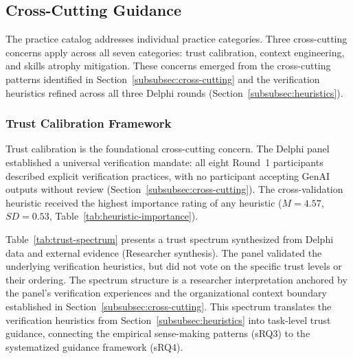 \subsection{Cross-Cutting Guidance}\label{subsec:cross-cutting-guidance}

The practice catalog addresses individual practice categories. Three
cross-cutting concerns apply across all seven categories: trust calibration,
context engineering, and skills atrophy mitigation. These concerns emerged from
the cross-cutting patterns identified in Section~\ref{subsubsec:cross-cutting}
and the verification heuristics refined across all three Delphi rounds
(Section~\ref{subsubsec:heuristics}).

\subsubsection{Trust Calibration Framework}\label{subsubsec:trust-framework}

Trust calibration is the foundational cross-cutting concern. The Delphi panel
established a universal verification mandate: all eight Round~1 participants
described explicit verification practices, with no participant accepting GenAI
outputs without review (Section~\ref{subsubsec:cross-cutting}). The
cross-validation heuristic received the highest importance rating of any
heuristic ($M = 4.57$, $SD = 0.53$, Table~\ref{tab:heuristic-importance}).

Table~\ref{tab:trust-spectrum} presents a trust spectrum synthesized from Delphi
data and external evidence (Researcher synthesis). The panel validated the
underlying verification heuristics, but did not vote on the specific trust
levels or their ordering. The spectrum structure is a researcher
interpretation anchored by the panel's verification experiences and the
organizational context boundary established in
Section~\ref{subsubsec:cross-cutting}. This spectrum translates the
verification heuristics from Section~\ref{subsubsec:heuristics} into task-level
trust guidance, connecting the empirical sense-making patterns (sRQ3) to the
systematized guidance framework (sRQ4).

